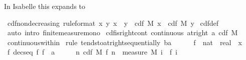 \documentclass{article}
\theoremstyle{definition}
\begin{document}
\medskip

In Isabelle this expands to

\medskip

\begin{isabellebody}
\isamarkupfalse%
\ cdf{\isacharunderscore}nondecreasing\ {\isacharbrackleft}rule{\isacharunderscore}format{\isacharbrackright}{\isacharcolon}\ {\isachardoublequoteopen}{\isacharparenleft}{\isasymforall}x\ y{\isachardot}\ x\ {\isasymle}\ y\ {\isasymlongrightarrow}\ cdf\ M\ x\ {\isasymle}\ cdf\ M\ y{\isacharparenright}{\isachardoublequoteclose}\isanewline
{}\isamarkupfalse%
\ cdf{\isacharunderscore}def\ \isamarkupfalse%
\ {\isacharparenleft}auto\ intro{\isacharbang}{\isacharcolon}\ finite{\isacharunderscore}measure{\isacharunderscore}mono{\isacharparenright}%
\isanewline\isanewline%
\isamarkupfalse%
\ cdf{\isacharunderscore}is{\isacharunderscore}right{\isacharunderscore}cont{\isacharcolon}\ {\isachardoublequoteopen}continuous\ {\isacharparenleft}at{\isacharunderscore}right\ a{\isacharparenright}\ {\isacharparenleft}cdf\ M{\isacharparenright}{\isachardoublequoteclose}\isanewline
{}\isamarkupfalse%
\ continuous{\isacharunderscore}within\isanewline
{}\isamarkupfalse%
\ {\isacharparenleft}rule\ tendsto{\isacharunderscore}at{\isacharunderscore}right{\isacharunderscore}sequentially{\isacharbrackleft}\ b{\isacharequal}{\isachardoublequoteopen}a\ {\isacharplus}\ {}{\isachardoublequoteclose}{\isacharbrackright}{\isacharparenright}\isanewline
\ \ \isamarkupfalse%
\ f\ {\isacharcolon}{\isacharcolon}\ {\isachardoublequoteopen}nat\ {\isasymRightarrow}\ real{\isachardoublequoteclose}\ \ x\ \isamarkupfalse%
\ f{\isacharcolon}\ {\isachardoublequoteopen}decseq\ f{\isachardoublequoteclose}\ {\isachardoublequoteopen}f\ {\isacharminus}{\isacharminus}{\isacharminus}{\isacharminus}{\isachargreater}\ a{\isachardoublequoteclose}\isanewline
\ \ \isamarkupfalse%
\ \isamarkupfalse%
\ {\isachardoublequoteopen}{\isacharparenleft}{\isasymlambda}n{\isachardot}\ cdf\ M\ {\isacharparenleft}f\ n{\isacharparenright}{\isacharparenright}\ {\isacharminus}{\isacharminus}{\isacharminus}{\isacharminus}{\isachargreater}\ measure\ M\ {\isacharparenleft}{\isasymInter}i{\isachardot}\ {\isacharbraceleft}{\isachardot}{\isachardot}\ f\ i{\isacharbraceright}{\isacharparenright}{\isachardoublequoteclose}\isanewline
\ \ \ \ \isamarkupfalse%

\end{isabellebody}
\end{document}
